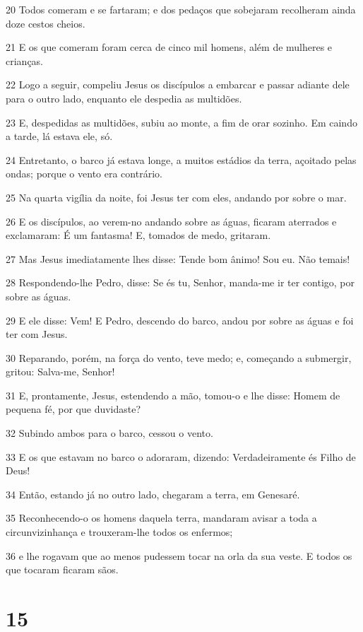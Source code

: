 \par 20 Todos comeram e se fartaram; e dos pedaços que sobejaram recolheram ainda doze cestos cheios.
\par 21 E os que comeram foram cerca de cinco mil homens, além de mulheres e crianças.
\par 22 Logo a seguir, compeliu Jesus os discípulos a embarcar e passar adiante dele para o outro lado, enquanto ele despedia as multidões.
\par 23 E, despedidas as multidões, subiu ao monte, a fim de orar sozinho. Em caindo a tarde, lá estava ele, só.
\par 24 Entretanto, o barco já estava longe, a muitos estádios da terra, açoitado pelas ondas; porque o vento era contrário.
\par 25 Na quarta vigília da noite, foi Jesus ter com eles, andando por sobre o mar.
\par 26 E os discípulos, ao verem-no andando sobre as águas, ficaram aterrados e exclamaram: É um fantasma! E, tomados de medo, gritaram.
\par 27 Mas Jesus imediatamente lhes disse: Tende bom ânimo! Sou eu. Não temais!
\par 28 Respondendo-lhe Pedro, disse: Se és tu, Senhor, manda-me ir ter contigo, por sobre as águas.
\par 29 E ele disse: Vem! E Pedro, descendo do barco, andou por sobre as águas e foi ter com Jesus.
\par 30 Reparando, porém, na força do vento, teve medo; e, começando a submergir, gritou: Salva-me, Senhor!
\par 31 E, prontamente, Jesus, estendendo a mão, tomou-o e lhe disse: Homem de pequena fé, por que duvidaste?
\par 32 Subindo ambos para o barco, cessou o vento.
\par 33 E os que estavam no barco o adoraram, dizendo: Verdadeiramente és Filho de Deus!
\par 34 Então, estando já no outro lado, chegaram a terra, em Genesaré.
\par 35 Reconhecendo-o os homens daquela terra, mandaram avisar a toda a circunvizinhança e trouxeram-lhe todos os enfermos;
\par 36 e lhe rogavam que ao menos pudessem tocar na orla da sua veste. E todos os que tocaram ficaram sãos.

\chapter{15}

